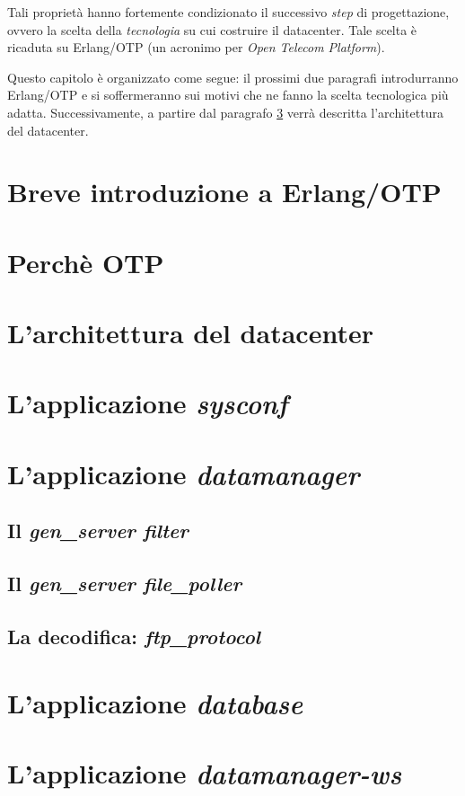%
Tali propriet\`a hanno fortemente condizionato il successivo \emph{step} di
progettazione, ovvero la scelta della \emph{tecnologia} su cui costruire il 
datacenter.
%
Tale scelta \`e ricaduta su Erlang/OTP (un acronimo per \emph{Open Telecom 
Platform}).
%

%
Questo capitolo \`e organizzato come segue: il prossimi due paragrafi
introdurranno Erlang/OTP e si soffermeranno sui motivi che ne fanno la scelta 
tecnologica pi\`u adatta. Successivamente, a partire dal paragrafo \ref{datacenter-arch} 
verr\`a descritta l'architettura del datacenter.

\section{Breve introduzione a Erlang/OTP}%

\section{Perch\`e OTP}

\section{L'architettura del datacenter}
\label{datacenter-arch}
\section{L'applicazione \emph{sysconf}}
\section{L'applicazione \emph{datamanager}}
\subsection{Il \emph{gen\_server filter}}
\subsection{Il \emph{gen\_server file\_poller}}
\subsection{La decodifica: \emph{ftp\_protocol}}
\section{L'applicazione \emph{database}}
\section{L'applicazione \emph{datamanager-ws}}
